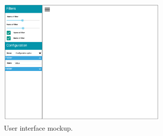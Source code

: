 
\begin{figure}[H]
	\centering
    \includegraphics[width=0.75\textwidth]{images/design/mockups/interface}
    \caption[User interface mockup]{User interface mockup.}
    \label{fig:user_interface_mockup}
\end{figure}
